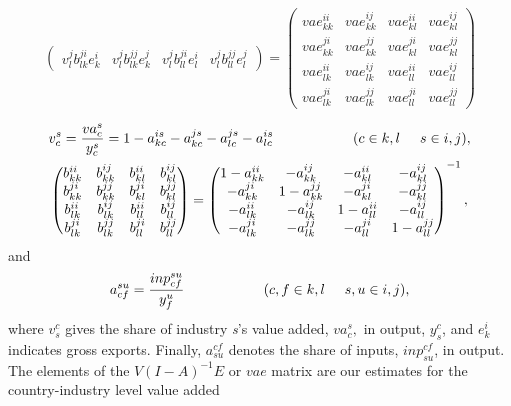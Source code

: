 \documentclass[a4paper]{article}\usepackage[]{graphicx}\usepackage[]{color}
\begin{document}
\begin{align}
\begin{split}
\begin{pmatrix}
v_{l}^{j}b_{lk}^{ji}e_{k}^{i}& v_{l}^{j}b_{lk}^{jj}e_{k}^{j}& v_{l}^{j}b_{ll}^{ji}e_{l}^{i}& v_{l}^{j}b_{ll}^{jj}e_{l}^{j}
\end{pmatrix}
=
\begin{pmatrix}
vae_{kk}^{ii}& vae_{kk}^{ij}& vae_{kl}^{ii}& vae_{kl}^{ij}\\
vae_{kk}^{ji}& vae_{kk}^{jj}& vae_{kl}^{ji}& vae_{kl}^{jj}\\
vae_{lk}^{ii}& vae_{lk}^{ij}& vae_{ll}^{ii}& vae_{ll}^{ij}\\
vae_{lk}^{ji}& vae_{lk}^{jj}& vae_{ll}^{ji}& vae_{ll}^{jj}
\end{pmatrix}
\end{split}
\end{align}
\begin{align*}
&v_{c}^{s} = \frac{va_{c}^{s}}{y_{c}^{s}} = 1 - a_{kc}^{is} - a_{kc}^{js} - a_{lc}^{js} - a_{lc}^{is} \hspace{2cm} (c \in k,l \hspace{.5cm} s \in i,j),\\
&\begin{pmatrix}
b_{kk}^{ii}& b_{kk}^{ij}& b_{kl}^{ii}& b_{kl}^{ij}\\
b_{kk}^{ji}& b_{kk}^{jj}& b_{kl}^{ji}& b_{kl}^{jj}\\
b_{lk}^{ii}& b_{lk}^{ij}& b_{ll}^{ii}& b_{ll}^{ij}\\
b_{lk}^{ji}& b_{lk}^{jj}& b_{ll}^{ji}& b_{ll}^{jj}
\end{pmatrix}
=
\begin{pmatrix}
1-a_{kk}^{ii}& -a_{kk}^{ij}& -a_{kl}^{ii}& -a_{kl}^{ij}\\
-a_{kk}^{ji}& 1-a_{kk}^{jj}& -a_{kl}^{ji}& -a_{kl}^{jj}\\
-a_{lk}^{ii}& -a_{lk}^{ij}& 1-a_{ll}^{ii}& -a_{ll}^{ij}\\
-a_{lk}^{ji}& -a_{lk}^{jj}& -a_{ll}^{ji}& 1-a_{ll}^{jj}
\end{pmatrix}^{-1},
\end{align*}
and
\begin{equation*}
a_{cf}^{su} = \frac{inp_{cf}^{su}}{y_{f}^{u}}  \hspace{2cm} (c,f \in k,l \hspace{.5cm} s,u \in i,j),
\end{equation*}
where \(v_{s}^{c}\) gives the share of industry \emph{s}'s value added, \(va_{c}^{s},\) in output, \(y_{s}^{c}\), and \(e_{k}^{i}\) indicates gross exports. Finally, \(a_{su}^{cf}\) denotes the share of inputs, \(inp_{su}^{cf}\), in output.
The elements of the $V(I-A)^{-1}E$ or $vae$ matrix are our estimates for the country-industry level value added
\end{document}
